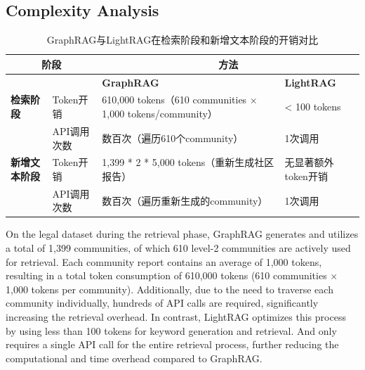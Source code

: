\subsection{Complexity Analysis}

\begin{table}[h]
\centering
\begin{tabular}{|l|l|l|l|}
\hline
\multicolumn{2}{|c|}{\textbf{阶段}}          & \multicolumn{2}{c|}{\textbf{方法}}                     \\ \hline
\textbf{}          & \textbf{} & \textbf{GraphRAG}                                      & \textbf{LightRAG}                              \\ \hline
\textbf{检索阶段}   & Token开销  & 610,000 tokens（610 communities × 1,000 tokens/community） & < 100 tokens                                   \\ \hline
                    & API调用次数 & 数百次（遍历610个community）                              & 1次调用                                       \\ \hline
\textbf{新增文本阶段} & Token开销  & 1,399 * 2 * 5,000 tokens（重新生成社区报告）                & 无显著额外token开销                           \\ \hline
                    & API调用次数 & 数百次（遍历重新生成的community）                          & 1次调用                                       \\ \hline
\end{tabular}
\caption{GraphRAG与LightRAG在检索阶段和新增文本阶段的开销对比}
\end{table}


On the legal dataset during the retrieval phase, GraphRAG generates and utilizes a total of 1,399 communities, of which 610 level-2 communities are actively used for retrieval. Each community report contains an average of 1,000 tokens, resulting in a total token consumption of 610,000 tokens (610 communities × 1,000 tokens per community). Additionally, due to the need to traverse each community individually, hundreds of API calls are required, significantly increasing the retrieval overhead. In contrast, LightRAG optimizes this process by using less than 100 tokens for keyword generation and retrieval. And only requires a single API call for the entire retrieval process, further reducing the computational and time overhead compared to GraphRAG.


